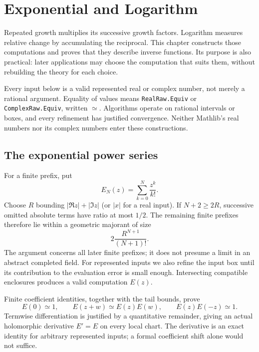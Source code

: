 \chapter{Exponential and Logarithm}\label{ch:exponential-logarithm}

Repeated growth multiplies its successive growth factors. Logarithm measures
relative change by accumulating the reciprocal. This chapter constructs those
computations and proves that they describe inverse functions. Its purpose is
also practical: later applications may choose the computation that suits them,
without rebuilding the theory for each choice.

Every input below is a valid represented real or complex number, not merely a
rational argument. Equality of values means \texttt{RealRaw.Equiv} or
\texttt{ComplexRaw.Equiv}, written $\simeq$. Algorithms operate on rational
intervals or boxes, and every refinement has justified convergence. Neither
Mathlib's real numbers nor its complex numbers enter these constructions.

\section{The exponential power series}\label{sec:exponential-power-series}

For a finite prefix, put
\[
 E_N(z)=\sum_{k=0}^{N}\frac{z^k}{k!}.
\]
Choose $R$ bounding $|\Re z|+|\Im z|$ (or $|x|$ for a real input).
If $N+2\geq 2R$, successive omitted
absolute terms have ratio at most $1/2$. The remaining finite prefixes
therefore lie within a geometric majorant of size
\[
 2\frac{R^{N+1}}{(N+1)!}.
\]
The argument concerns all later finite prefixes; it does not presume a limit
in an abstract completed field. For represented inputs we also refine the
input box until its contribution to the evaluation error is small enough.
Intersecting compatible enclosures produces a valid computation $E(z)$.

\leanok

Finite coefficient identities, together with the tail bounds, prove
\[
 E(0)\simeq 1,\qquad E(z+w)\simeq E(z)E(w),\qquad
 E(z)E(-z)\simeq 1.
\]
Termwise differentiation is justified by a quantitative remainder, giving an
actual holomorphic derivative $E'=E$ on every local chart. The derivative is
an exact identity for arbitrary represented inputs; a formal coefficient
shift alone would not suffice.

